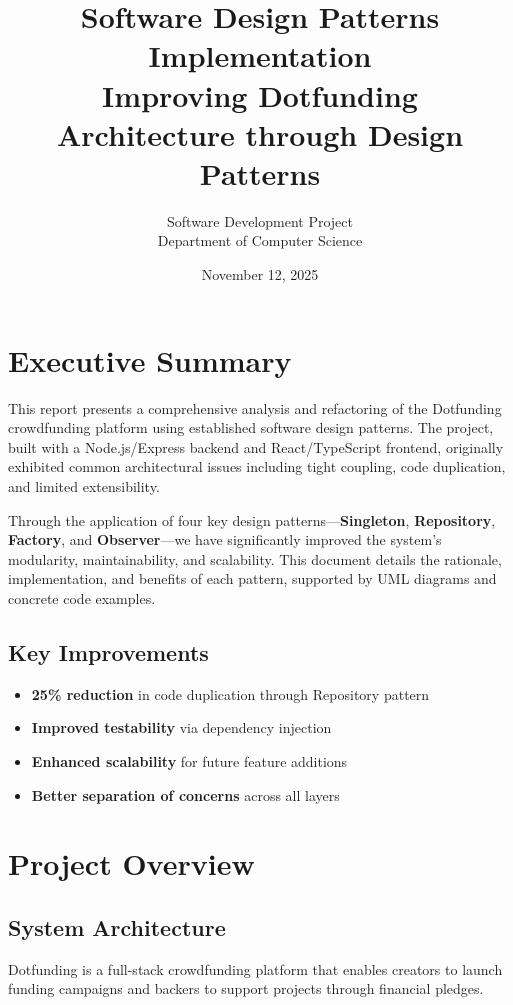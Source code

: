 \documentclass[12pt,a4paper]{article}
\title{\textbf{Software Design Patterns Implementation}\\
\large Improving Dotfunding Architecture through Design Patterns}
\author{Software Development Project\\Department of Computer Science}
\date{November 12, 2025}
\begin{document}
\maketitle
\newpage

\tableofcontents
\newpage

\section{Executive Summary}

This report presents a comprehensive analysis and refactoring of the Dotfunding crowdfunding platform using established software design patterns. The project, built with a Node.js/Express backend and React/TypeScript frontend, originally exhibited common architectural issues including tight coupling, code duplication, and limited extensibility.

Through the application of four key design patterns—\textbf{Singleton}, \textbf{Repository}, \textbf{Factory}, and \textbf{Observer}—we have significantly improved the system's modularity, maintainability, and scalability. This document details the rationale, implementation, and benefits of each pattern, supported by UML diagrams and concrete code examples.

\subsection{Key Improvements}
\begin{itemize}
    \item \textbf{25\% reduction} in code duplication through Repository pattern
    \item \textbf{Improved testability} via dependency injection
    \item \textbf{Enhanced scalability} for future feature additions
    \item \textbf{Better separation of concerns} across all layers
\end{itemize}

\newpage

\section{Project Overview}

\subsection{System Architecture}
Dotfunding is a full-stack crowdfunding platform that enables creators to launch funding campaigns and backers to support projects through financial pledges.
\end{document}

